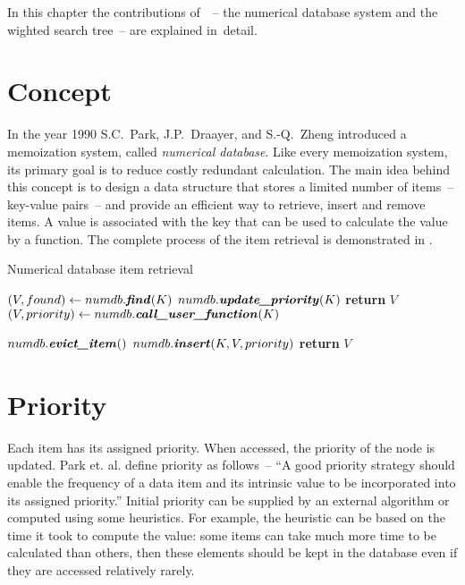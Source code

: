 In this chapter the contributions of~\cite{park90}~-- the numerical database system and the wighted search tree~-- are explained in~detail.

\section{Concept}
In the year 1990 S.C.~Park, J.P.~Draayer, and S.-Q.~Zheng introduced a memoization system, called \emph{numerical database}\cite{park90}. Like every memoization system, its primary goal is to reduce costly redundant calculation. The main idea behind this concept is to design a data structure that stores a limited number of items~-- key-value pairs~-- and provide an efficient way to retrieve, insert and remove items. A value is associated with the key that can be used to calculate the value by a function. The complete process of the item retrieval is demonstrated in .

\begin{algorithm}[t]
\caption{Numerical database item retrieval}\label{alg:numdb_get}
\begin{algorithmic}[1]
    \State $(V, found) \gets numdb.\textbf{\textit{find}}(K) $
      \State $numdb.\textbf{\textit{update\_priority}}(K) $ 
      \State \textbf{return} $V$
    \EndIf
    \State {}
    \State $(V, priority) \gets numdb.\textbf{\textit{call\_user\_function}}(K)$

      \State $numdb.\textbf{\textit{evict\_item}}()$ 
    \EndIf
    \State $numdb.\textbf{\textit{insert}}(K, V, priority)$
    \State \textbf{return} $V$
  \EndProcedure
\end{algorithmic}
\end{algorithm}

\section{Priority}
\label{sec:wst_priority}

Each item has its assigned priority. When accessed, the priority of the node is updated. Park et. al. define priority as follows~-- ``A good priority strategy should enable the frequency of a data item and its intrinsic value to be incorporated into its assigned priority.'' Initial priority can be supplied by an external algorithm or computed using some heuristics. For example, the heuristic can be based on the time it took to compute the value: some items can take much more time to be calculated than others, then these elements should be kept in the database even if they are accessed relatively rarely.

